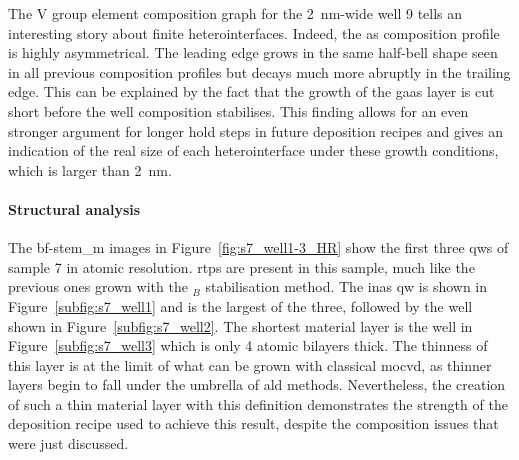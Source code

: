 The V group element composition graph for the \qty{2}{\nano\metre}-wide well 9 tells an interesting story about finite heterointerfaces. Indeed, the \acl{as} composition profile is highly asymmetrical. The leading edge grows in the same half-bell shape seen in all previous composition profiles but decays much more abruptly in the trailing edge. This can be explained by the fact that the growth of the \acs{gaas} layer is cut short before the well composition stabilises. This finding allows for an even stronger argument for longer hold steps in future deposition recipes and gives an indication of the real size of each heterointerface under these growth conditions, which is larger than \qty{2}{\nano\metre}.
\par

\paragraph{Structural analysis} The \acs{bf}-\acs{stem_m} images in Figure~\ref{fig:s7_well1-3_HR} show the first three \acl{qw}s of sample 7 in atomic resolution. \Acl{rtp}s are present in this sample, much like the previous ones grown with the \(_B\) stabilisation method. The \acs{inas} \acs{qw} is shown in Figure~\ref{subfig:s7_well1} and is the largest of the three, followed by the  well shown in Figure~\ref{subfig:s7_well2}. The shortest material layer is the  well in Figure~\ref{subfig:s7_well3} which is only \num{4} atomic bilayers thick. The thinness of this layer is at the limit of what can be grown with classical \acs{mocvd}, as thinner layers begin to fall under the umbrella of \acf{ald} methods. Nevertheless, the creation of such a thin material layer with this definition demonstrates the strength of the deposition recipe used to achieve this result, despite the composition issues that were just discussed.
\par


